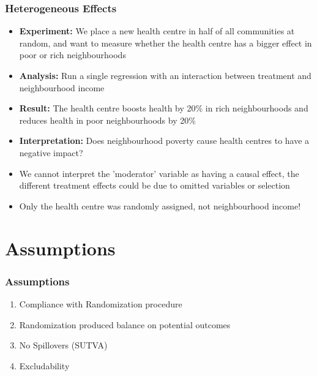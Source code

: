 \documentclass[xcolor=x11names,compress]{beamer}\usepackage[]{graphicx}\usepackage[]{color}
\renewcommand{\(}{\begin{columns}}
\renewcommand{\)}{\end{columns}}
\newcommand{\<}[1]{\begin{column}{#1}}
\renewcommand{\>}{\end{column}}
\begin{document}
\begin{frame}
\frametitle{Heterogeneous Effects}
\begin{itemize}
\item \textbf{Experiment:} We place a new health centre in half of all communities at random, and want to measure whether the health centre has a bigger effect in poor or rich neighbourhoods
\pause
\item \textbf{Analysis:} Run a single regression with an interaction between treatment and neighbourhood income
\pause
\item \textbf{Result:} The health centre boosts health by 20\% in rich neighbourhoods and reduces health in poor neighbourhoods by 20\%
\pause
\item \textbf{Interpretation:} Does neighbourhood poverty cause health centres to have a negative impact?  
\pause
\item We cannot interpret the 'moderator' variable as having a causal effect, the different treatment effects could be due to omitted variables or selection
\pause
\item Only the health centre was randomly assigned, not neighbourhood income!
\end{itemize}
\end{frame}

\section{Assumptions}

\begin{frame}
\frametitle{Assumptions}
\begin{enumerate}
\item Compliance with Randomization procedure
\pause
\item Randomization produced balance on potential outcomes
\pause
\item No Spillovers (SUTVA)
\pause
\item Excludability
\pause
\end{enumerate}
\end{frame}
\end{document}
